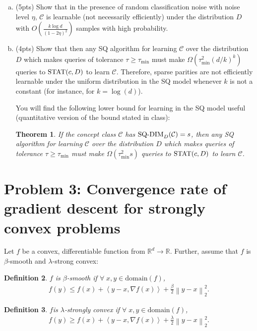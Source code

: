 \documentclass[11pt]{article}
\newcommand{\calC}{{\mathcal{C}}}
\newcommand{\blue}[1]{{\color{blue}#1}}
\newcommand{\R}{\mathbb{R}}
\newcommand{\domain}{\text{domain}}
\newcommand{\inner}[2]{\left\langle #1,#2 \right\rangle}
\newcommand{\statoracle}{{\text{\rm STAT}}}
\newcommand{\sqdim}{{\text{\rm SQ-DIM}}}
\newcommand{\twonorm}[1]{\left\| #1\right\|_2}
\newtheorem{theorem}{Theorem}
\newtheorem{definition}[theorem]{Definition}
\begin{document}
\begin{enumerate}[(a)]
    \item (\blue{5pts}) Show that in the presence of random classification noise with noise level $\eta$, $\calC$ is learnable (not necessarily efficiently) under the distribution $D$ with $O\left(\frac{k\log d}{(1-2\eta)^2}\right)$ samples with high probability. 
    \item (\blue{4pts}) Show that then any SQ algorithm for learning $\calC$ over the distribution $D$ which makes queries of tolerance $\tau\ge \tau_{\min}$ must make $\Omega(\tau_{\min}^2(d/k)^k)$ queries to  $\statoracle(c,D)$ to learn $\calC$. Therefore, sparse parities are not efficiently learnable under the uniform distribution in the SQ model whenever $k$ is not a constant (for instance, for $k=\log(d)$). 
    
    You will find the following lower bound for learning in the SQ model useful (quantitative version of the bound stated in class):
    
    \begin{theorem}
    If the concept class $\calC$ has $\sqdim_{D}(\calC)=s$, then any SQ algorithm for learning $\calC$ over the distribution $D$ which makes queries of tolerance $\tau\ge \tau_{\min}$ must make $\Omega(\tau_{\min}^2s)$ queries to  $\statoracle(c,D)$ to learn $\calC$.
    \end{theorem}
\end{enumerate}


\section*{Problem 3: Convergence rate of gradient descent for strongly convex problems}

Let $f$ be a convex, differentiable function from $\R^d \rightarrow \R$. Further, assume that $f$ is $\beta$-smooth and $\lambda$-strong convex: 

\begin{definition}
$f$ is $\beta$-smooth if $\forall\; x, y \in \domain(f)$,
\begin{align*}
    f(y) \le f(x) + \inner{y-x}{\nabla f(x)}+\frac{\beta}{2}\twonorm{y-x}^2.
\end{align*}
\end{definition}
\begin{definition}

$f$is $\lambda$-strongly convex if $\forall\; x, y \in \domain(f)$,
\begin{align*}
    f(y) \ge f(x) + \inner{y-x}{\nabla f(x)}+\frac{\lambda}{2}\twonorm{y-x}^2.
\end{align*}
\end{definition}
\end{document}
